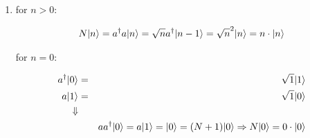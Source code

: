 \documentclass[a4paper,10pt]{hw}
\DeclarePairedDelimiter\ket{\lvert}{\rangle}
\begin{document}
\begin{enumerate}
\item
for $n>0$:

\begin{align*}
N\ket{n} = a^\dagger a \ket{n} =  \sqrt{n} a^\dagger \ket{n-1} = \sqrt{n}^2 \ket{n} = n\cdot \ket{n}
\end{align*}

for $n=0$:

\begin{align*}
a^\dagger \ket{0} &=& \sqrt{1}\ket{1} \\
a \ket{1} &=& \sqrt{1} \ket{0}\\
\Downarrow \\
&& a a^\dagger \ket{0} = a\ket{1} = \ket{0} = (N + 1)\ket{0} \Rightarrow N\ket{0} = 0\cdot\ket{0}
\end{align*}


\end{enumerate}
\end{document}
